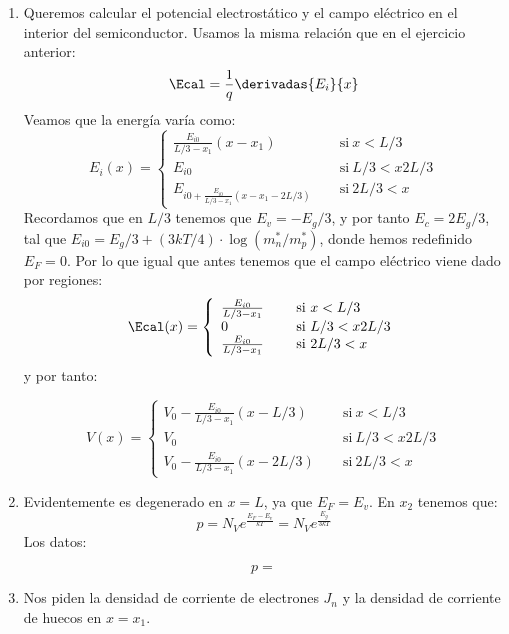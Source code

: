 	\begin{enumerate}[label=\alph*)]
		\item Queremos calcular el potencial electrostático y el campo eléctrico en el interior del semiconductor. Usamos la misma relación que en el ejercicio anterior:
		\begin{equation}
			\Ecal = \frac{1}{q} \derivadas{E_i}{x}
		\end{equation}
		Veamos que la energía varía como:
		\begin{equation}
			E_i(x) = \left\lbrace \begin{array}{ll}
				\frac{E_{i0}}{L/3-x_1} (x-x_1) \quad & \ \text{si} \ x<L/3 \\
				E_{i0} \quad & \ \text{si} \ L/3<x2L/3 \\
				E_{i0+\frac{E_{i0}}{L/3-x_1} (x-x_1-2L/3)} \quad & \ \text{si} \ 2L/3<x
			\end{array} \right.
		\end{equation}
		Recordamos que en $L/3$ tenemos que $E_v=-E_g/3$, y por tanto $E_c=2E_g/3$, tal que $E_{i0}=E_g/3+(3kT/4)\cdot \log(m_n^*/m_p^*)$, donde hemos redefinido $E_F=0$. Por lo que igual que antes tenemos que el campo eléctrico viene dado por regiones:
		\begin{equation}
			\Ecal(x) = \left\lbrace \begin{array}{ll}
				\frac{E_{i0}}{L/3-x_1} \quad & \ \text{si} \ x<L/3\\
				0 \quad & \ \text{si} \ L/3<x2L/3 \\
				\frac{E_{i0}}{L/3-x_1} \quad & \ \text{si} \ 2L/3<x
			\end{array} \right.
		\end{equation}
		y por tanto:

		\begin{equation}
			V(x) = \left\lbrace \begin{array}{ll}
				V_0 -\frac{E_{i0}}{L/3-x_1} (x-L/3) \quad & \ \text{si} \ x<L/3 \\
				V_0 \quad & \ \text{si} \ L/3<x2L/3 \\
				V_0 -\frac{E_{i0}}{L/3-x_1} (x-2L/3) \quad & \ \text{si} \ 2L/3<x
			\end{array} \right.
		\end{equation}
		\item  Evidentemente es degenerado en $x=L$, ya que $E_F=E_v$. En $x_2$ tenemos que:
		\begin{equation}
			p = N_V e^{\frac{E_F-E_v}{kT}} = N_V e^{\frac{E_g}{3kT}}
		\end{equation}
		Los datos:

		\begin{equation}
			p =
		\end{equation}
		\item Nos piden la densidad de corriente de electrones $J_n$ y la densidad de corriente de huecos en $x=x_1$.
	\end{enumerate}
